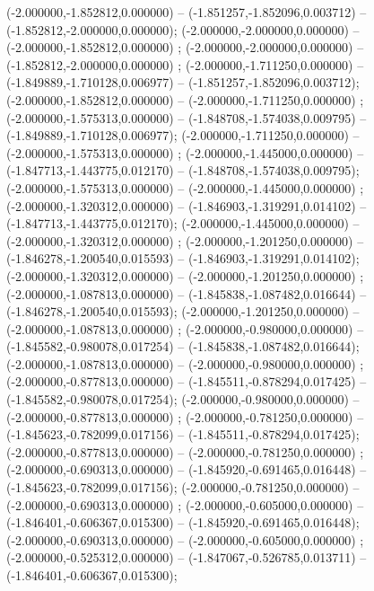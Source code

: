  (-2.000000,-1.852812,0.000000) -- (-1.851257,-1.852096,0.003712) -- (-1.852812,-2.000000,0.000000);
 (-2.000000,-2.000000,0.000000) -- (-2.000000,-1.852812,0.000000) ;
 (-2.000000,-2.000000,0.000000) -- (-1.852812,-2.000000,0.000000) ;
 (-2.000000,-1.711250,0.000000) -- (-1.849889,-1.710128,0.006977) -- (-1.851257,-1.852096,0.003712);
 (-2.000000,-1.852812,0.000000) -- (-2.000000,-1.711250,0.000000) ;
 (-2.000000,-1.575313,0.000000) -- (-1.848708,-1.574038,0.009795) -- (-1.849889,-1.710128,0.006977);
 (-2.000000,-1.711250,0.000000) -- (-2.000000,-1.575313,0.000000) ;
 (-2.000000,-1.445000,0.000000) -- (-1.847713,-1.443775,0.012170) -- (-1.848708,-1.574038,0.009795);
 (-2.000000,-1.575313,0.000000) -- (-2.000000,-1.445000,0.000000) ;
 (-2.000000,-1.320312,0.000000) -- (-1.846903,-1.319291,0.014102) -- (-1.847713,-1.443775,0.012170);
 (-2.000000,-1.445000,0.000000) -- (-2.000000,-1.320312,0.000000) ;
 (-2.000000,-1.201250,0.000000) -- (-1.846278,-1.200540,0.015593) -- (-1.846903,-1.319291,0.014102);
 (-2.000000,-1.320312,0.000000) -- (-2.000000,-1.201250,0.000000) ;
 (-2.000000,-1.087813,0.000000) -- (-1.845838,-1.087482,0.016644) -- (-1.846278,-1.200540,0.015593);
 (-2.000000,-1.201250,0.000000) -- (-2.000000,-1.087813,0.000000) ;
 (-2.000000,-0.980000,0.000000) -- (-1.845582,-0.980078,0.017254) -- (-1.845838,-1.087482,0.016644);
 (-2.000000,-1.087813,0.000000) -- (-2.000000,-0.980000,0.000000) ;
 (-2.000000,-0.877813,0.000000) -- (-1.845511,-0.878294,0.017425) -- (-1.845582,-0.980078,0.017254);
 (-2.000000,-0.980000,0.000000) -- (-2.000000,-0.877813,0.000000) ;
 (-2.000000,-0.781250,0.000000) -- (-1.845623,-0.782099,0.017156) -- (-1.845511,-0.878294,0.017425);
 (-2.000000,-0.877813,0.000000) -- (-2.000000,-0.781250,0.000000) ;
 (-2.000000,-0.690313,0.000000) -- (-1.845920,-0.691465,0.016448) -- (-1.845623,-0.782099,0.017156);
 (-2.000000,-0.781250,0.000000) -- (-2.000000,-0.690313,0.000000) ;
 (-2.000000,-0.605000,0.000000) -- (-1.846401,-0.606367,0.015300) -- (-1.845920,-0.691465,0.016448);
 (-2.000000,-0.690313,0.000000) -- (-2.000000,-0.605000,0.000000) ;
 (-2.000000,-0.525312,0.000000) -- (-1.847067,-0.526785,0.013711) -- (-1.846401,-0.606367,0.015300);

